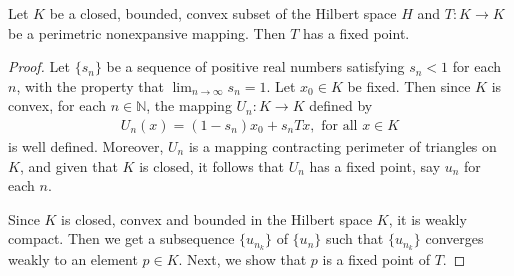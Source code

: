 \documentclass[10pt,a4paper]{amsart}
\begin{document}
\begin{theorem}\label{T35}
Let $K$ be a closed, bounded, convex subset of the Hilbert space $H$ and  $T: K \to K$ be a perimetric nonexpansive mapping. Then $T$ has a fixed point.
\end{theorem}

\begin{proof}
Let $\{s_n\}$ be a sequence of positive real numbers satisfying $s_n < 1$ for each $n$, with the property that $\lim_{n \to \infty} s_n = 1$.
Let $x_0 \in K$  be fixed. Then since $K$ is convex, for each $n\in \mathbb{N}$, the mapping  $U_n: K \to K$ defined by 
\begin{align*}
U_n(x)= (1-s_n)x_0 +s_nTx, \text{ for all } x \in K
\end{align*} is well defined. Moreover, $U_n$ is a mapping contracting perimeter of triangles on $K$, and given that $K$ is closed, it follows that $U_n$ has a fixed point, say $u_n$ for each $n$.

Since $K$ is closed, convex and bounded in the Hilbert space $K$, it is weakly compact. Then we  get a subsequence $\{u_{n_k}\}$ of $\{u_n\}$ such that $\{u_{n_k}\}$ converges weakly to an element $p \in K$. Next, we show that $p$ is a fixed point of $T$.


\end{proof}
\end{document}

